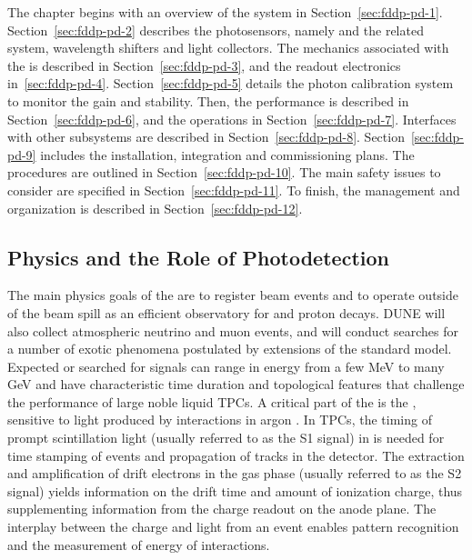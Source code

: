 The chapter begins with an overview of the system in Section~\ref{sec:fddp-pd-1}. Section~\ref{sec:fddp-pd-2} describes the photosensors, namely  %
and the related  system, wavelength shifters and light collectors. The mechanics associated with the  is described in Section~\ref{sec:fddp-pd-3}, and the readout electronics in~\ref{sec:fddp-pd-4}. Section~\ref{sec:fddp-pd-5} details the photon calibration system to monitor the  gain and stability. Then, the  performance is described in Section~\ref{sec:fddp-pd-6}, and the operations in Section~\ref{sec:fddp-pd-7}. Interfaces with other subsystems are described in Section~\ref{sec:fddp-pd-8}. Section~\ref{sec:fddp-pd-9} includes the installation, integration and commissioning plans. The  procedures are outlined in Section~\ref{sec:fddp-pd-10}. The main safety issues to consider are specified in Section~\ref{sec:fddp-pd-11}. To finish, the management and organization is described in Section~\ref{sec:fddp-pd-12}.

\subsection{Physics and the Role of Photodetection}
\label{sec:fddp-pd-1.2}

The main physics goals of the  are to register beam events %
and to operate outside of the beam spill as an efficient observatory for  and proton decays. DUNE will also collect atmospheric neutrino and muon events, and will conduct searches for a number of exotic phenomena postulated by extensions of the standard model.  Expected or searched for signals can range in energy from a few \si{MeV} to many \si{GeV} and have characteristic time duration and topological features that challenge the performance of large noble liquid TPCs. %
A critical part of the \lartpc is the , sensitive to light produced by interactions in argon \cite{Cuesta:2017nrs}. In \dual TPCs, the timing of prompt scintillation light (usually referred to as the S1 signal) in \lar is needed for time stamping of events and propagation of tracks in the detector. The extraction and amplification of drift electrons in the gas phase (usually referred to as the S2 signal) yields information on the drift time and amount of ionization charge, thus supplementing information from the charge readout on the anode plane. The interplay between the charge and light from an event enables %
pattern recognition and the measurement of energy of interactions.

